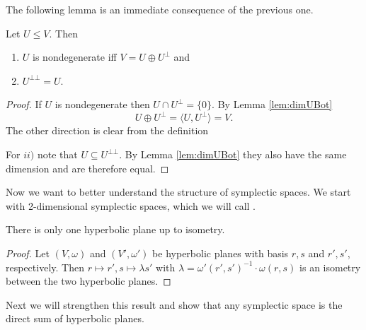 		
The following lemma is an immediate consequence of the previous one.
\begin{lemma}\label{lem:Ubotbot}
	Let $U\leq V$. Then
	\begin{enumerate}[label=\roman{*})]
		\item $U$ is nondegenerate iff $V=U\oplus U^\bot$ and
		\item $U^{\bot\bot}=U$.
	\end{enumerate}
\end{lemma}
\begin{proof}
	If $U$ is nondegenerate then $U\cap U^\bot=\{0\}$. By Lemma \ref{lem:dimUBot} \[U\oplus U^\bot=\langle U,U^\bot\rangle=V.\]
	The other direction is clear from the definition
				
	For $ii)$ note that $U\subseteq U^{\bot\bot}$. By Lemma \ref{lem:dimUBot} they also have the same dimension and are therefore equal.
\end{proof}
		
Now we want to better understand the structure of symplectic spaces. 
We start with 2-dimensional symplectic spaces, which we will call .
		
		
\begin{lemma}\label{lem:oneHypPlane}
	There is only one hyperbolic plane up to isometry.
\end{lemma}
\begin{proof}
	Let $(V,\omega)$ and $(V',\omega')$ be hyperbolic planes with basis $r,s$ and $r',s'$, respectively. 
	Then $r\mapsto r', s\mapsto \lambda s'$ with $\lambda=\omega'(r',s')^{-1}\cdot\omega(r,s)$ is an isometry between the two hyperbolic planes. 
\end{proof}
Next we will strengthen this result and show that any symplectic space is the direct sum of hyperbolic planes.
		

